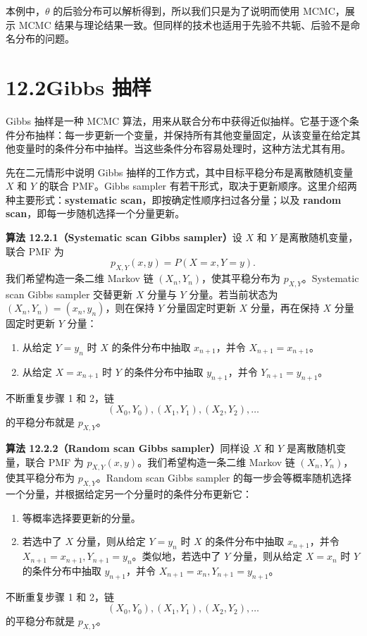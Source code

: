 \documentclass[UTF8,12pt,a4paper,fontset=fandol]{ctexart}
\begin{document}
本例中，$\theta$ 的后验分布可以解析得到，所以我们只是为了说明而使用 MCMC，展示 MCMC 结果与理论结果一致。但同样的技术也适用于先验不共轭、后验不是命名分布的问题。

\section*{12.2\quad Gibbs 抽样}

Gibbs 抽样是一种 MCMC 算法，用来从联合分布中获得近似抽样。它基于逐个条件分布抽样：每一步更新一个变量，并保持所有其他变量固定，从该变量在给定其他变量时的条件分布中抽样。当这些条件分布容易处理时，这种方法尤其有用。

先在二元情形中说明 Gibbs 抽样的工作方式，其中目标平稳分布是离散随机变量 $X$ 和 $Y$ 的联合 PMF。Gibbs sampler 有若干形式，取决于更新顺序。这里介绍两种主要形式：\textbf{systematic scan}，即按确定性顺序扫过各分量；以及 \textbf{random scan}，即每一步随机选择一个分量更新。

\noindent\textbf{算法 12.2.1（Systematic scan Gibbs sampler）}\quad 设 $X$ 和 $Y$ 是离散随机变量，联合 PMF 为
\[
  p_{X,Y}(x,y)=P(X=x,Y=y).
\]
我们希望构造一条二维 Markov 链 $(X_n,Y_n)$，使其平稳分布为 $p_{X,Y}$。Systematic scan Gibbs sampler 交替更新 $X$ 分量与 $Y$ 分量。若当前状态为 $(X_n,Y_n)=(x_n,y_n)$，则在保持 $Y$ 分量固定时更新 $X$ 分量，再在保持 $X$ 分量固定时更新 $Y$ 分量：
\begin{enumerate}
  \item 从给定 $Y=y_n$ 时 $X$ 的条件分布中抽取 $x_{n+1}$，并令 $X_{n+1}=x_{n+1}$。
  \item 从给定 $X=x_{n+1}$ 时 $Y$ 的条件分布中抽取 $y_{n+1}$，并令 $Y_{n+1}=y_{n+1}$。
\end{enumerate}
不断重复步骤 1 和 2，链
\[
  (X_0,Y_0),(X_1,Y_1),(X_2,Y_2),\ldots
\]
的平稳分布就是 $p_{X,Y}$。

\noindent\textbf{算法 12.2.2（Random scan Gibbs sampler）}\quad 同样设 $X$ 和 $Y$ 是离散随机变量，联合 PMF 为 $p_{X,Y}(x,y)$。我们希望构造一条二维 Markov 链 $(X_n,Y_n)$，使其平稳分布为 $p_{X,Y}$。Random scan Gibbs sampler 的每一步会等概率随机选择一个分量，并根据给定另一个分量时的条件分布更新它：
\begin{enumerate}
  \item 等概率选择要更新的分量。
  \item 若选中了 $X$ 分量，则从给定 $Y=y_n$ 时 $X$ 的条件分布中抽取 $x_{n+1}$，并令 $X_{n+1}=x_{n+1},Y_{n+1}=y_n$。类似地，若选中了 $Y$ 分量，则从给定 $X=x_n$ 时 $Y$ 的条件分布中抽取 $y_{n+1}$，并令 $X_{n+1}=x_n,Y_{n+1}=y_{n+1}$。
\end{enumerate}
不断重复步骤 1 和 2，链
\[
  (X_0,Y_0),(X_1,Y_1),(X_2,Y_2),\ldots
\]
的平稳分布就是 $p_{X,Y}$。
\end{document}

